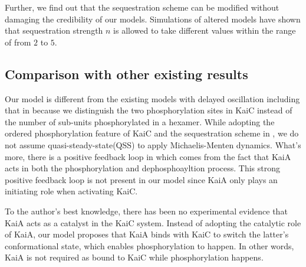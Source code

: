 \documentclass[a4paper,10pt]{article}
\numberwithin{equation}{section}
\begin{document}

Further, we find out  that the sequestration scheme can be modified without damaging the credibility of our models. Simulations of altered models have shown that sequestration strength $n$ is allowed to take different values within the range of from $2$ to $5$.





\subsection{Comparison with other existing results}
Our model is different from the existing models with delayed oscillation including that in \citet{van2007} because we distinguish the two phosphorylation sites in KaiC instead of the number of sub-units phosphorylated in a hexamer. While adopting the ordered phosphorylation feature of KaiC and the sequestration scheme in \citet{rust809}, we do not assume quasi-steady-state(QSS) to apply Michaelis-Menten dynamics. What's more, there is a positive feedback loop in \citet{rust809} which comes from the fact that KaiA acts in both the phosphorylation and dephosphoayltion process. This strong positive feedback loop is not present in our model since KaiA only plays an initiating role when activating KaiC. 

To the author's best knowledge, there has been no experimental evidence that KaiA acts as a catalyst in the KaiC system. Instead of adopting the catalytic role of KaiA, our model proposes that KaiA binds with KaiC to switch the latter's conformational state, which enables phosphorylation to happen. In other words, KaiA is not required as bound to KaiC while phosphorylation happens. 
\end{document}
